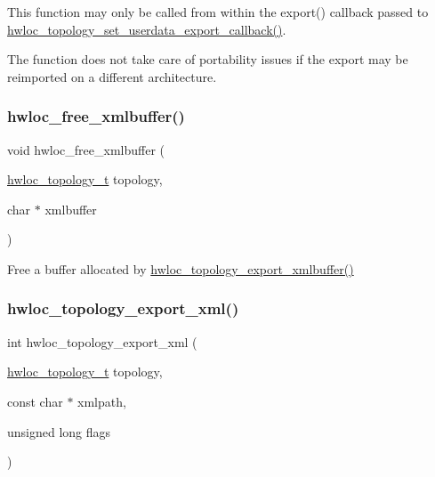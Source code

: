 This function may only be called from within the export() callback passed to \hyperlink{a00206_ga9d6ff0f7a8dd45be9aa8575ef31978cc}{hwloc\+\_\+topology\+\_\+set\+\_\+userdata\+\_\+export\+\_\+callback()}.

The function does not take care of portability issues if the export may be reimported on a different architecture. \mbox{\label{a00206_ga293e4a6489f15fd16ad22a5734561cf1}} 
\subsubsection{\texorpdfstring{hwloc\+\_\+free\+\_\+xmlbuffer()}{hwloc\_free\_xmlbuffer()}}
{\footnotesize\ttfamily void hwloc\+\_\+free\+\_\+xmlbuffer (\begin{DoxyParamCaption}\item[{\hyperlink{a00186_ga9d1e76ee15a7dee158b786c30b6a6e38}{hwloc\+\_\+topology\+\_\+t}}]{topology,  }\item[{char $\ast$}]{xmlbuffer }\end{DoxyParamCaption})}



Free a buffer allocated by \hyperlink{a00206_gad33b7f7c11db10459505a3b1634fd3f1}{hwloc\+\_\+topology\+\_\+export\+\_\+xmlbuffer()} 

\mbox{\label{a00206_ga333f79975b4eeb28a3d8fad3373583ce}} 
\subsubsection{\texorpdfstring{hwloc\+\_\+topology\+\_\+export\+\_\+xml()}{hwloc\_topology\_export\_xml()}}
{\footnotesize\ttfamily int hwloc\+\_\+topology\+\_\+export\+\_\+xml (\begin{DoxyParamCaption}\item[{\hyperlink{a00186_ga9d1e76ee15a7dee158b786c30b6a6e38}{hwloc\+\_\+topology\+\_\+t}}]{topology,  }\item[{const char $\ast$}]{xmlpath,  }\item[{unsigned long}]{flags }\end{DoxyParamCaption})}



